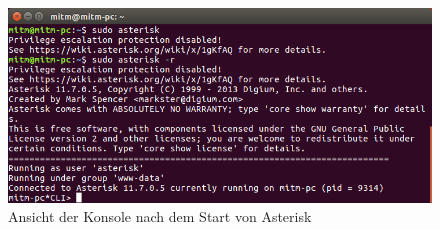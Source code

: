 \begin{figure}[htbp]
	\centering
		\includegraphics[width=1.00\textwidth]{includes/Start_asterisk}
	\caption{Ansicht der Konsole nach dem Start von Asterisk}
	\label{fig:start_asterisk}
\end{figure}

